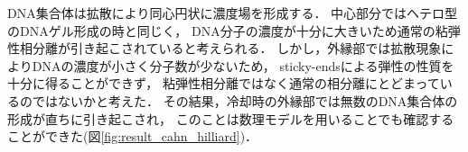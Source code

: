DNA集合体は拡散により同心円状に濃度場を形成する．
中心部分ではヘテロ型のDNAゲル形成の時と同じく，
DNA分子の濃度が十分に大きいため通常の粘弾性相分離が引き起こされていると考えられる．
しかし，外縁部では拡散現象によりDNAの濃度が小さく分子数が少ないため，
sticky-endsによる弾性の性質を十分に得ることができず，
粘弾性相分離ではなく通常の相分離にとどまっているのではないかと考えた．
その結果，冷却時の外縁部では無数のDNA集合体の形成が直ちに引き起こされ，
このことは数理モデルを用いることでも確認することができた(図\ref{fig:result_cahn_hilliard})．

